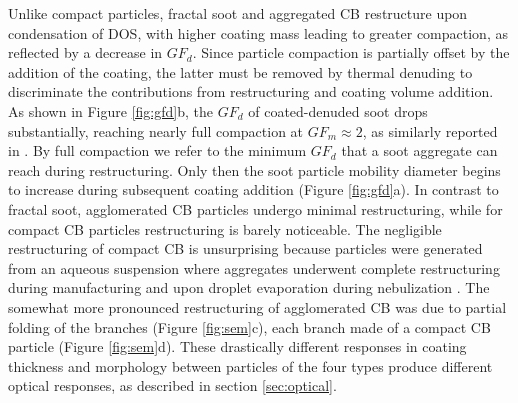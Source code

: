 Unlike compact particles, fractal soot and aggregated CB restructure upon condensation of DOS, with higher coating mass leading to greater compaction, as reflected by a decrease in $GF_d$. Since particle compaction is partially offset by the addition of the coating, the latter must be removed by thermal denuding to discriminate the contributions from restructuring and coating volume addition. As shown in Figure \ref{fig:gfd}b, the $GF_d$ of coated-denuded soot drops substantially, reaching nearly full compaction at $GF_m \approx 2$, as similarly reported in \citep{RN13}. By full compaction we refer to the minimum $GF_d$ that a soot aggregate can reach during restructuring. Only then the soot particle mobility diameter begins to increase during subsequent coating addition (Figure \ref{fig:gfd}a). In contrast to fractal soot, agglomerated CB particles undergo minimal restructuring, while for compact CB particles restructuring is barely noticeable. The negligible restructuring of compact CB is unsurprising because particles were generated from an aqueous suspension where aggregates underwent complete restructuring during manufacturing and upon droplet evaporation during nebulization \citep{RN51}. The somewhat more pronounced restructuring of agglomerated CB was due to partial folding of the branches (Figure \ref{fig:sem}c), each branch made of a compact CB particle (Figure \ref{fig:sem}d). These drastically different responses in coating thickness and morphology between particles of the four types produce different optical responses, as described in section \ref{sec:optical}.
